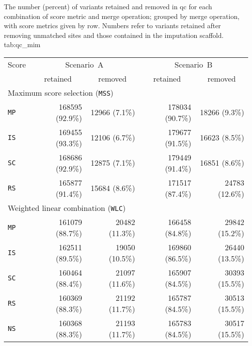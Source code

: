 

\begin{table}[!htb]
{The number (percent) of variants retained and removed in \gls{qc} for each combination of score metric and merge operation; grouped by merge operation, with score metrics given by row. Numbers refer to variants retained after removing unmatched sites and those contained in the imputation scaffold.}
{tab:qc_mim}
\centering
\begin{tabular}{lrrrr}
	\toprule
	\phantom{.} Score & \multicolumn{2}{c}{Scenario~A} & \multicolumn{2}{c}{Scenario~B} \\
	 \cmidrule(lr){2-3} \cmidrule(lr){4-5}
	 & \multicolumn{1}{c}{retained} & \multicolumn{1}{c}{removed}
	 & \multicolumn{1}{c}{retained} & \multicolumn{1}{c}{removed} \\
	\midrule
	\multicolumn{5}{l}{Maximum score selection (\texttt{MSS})} \\
	\midrule
	\phantom{.} \texttt{MP} &
	\num{168595} (92.9\%) & \num{12966} \phantom{0}(7.1\%)  &
	\num{178034} (90.7\%) & \num{18266} \phantom{0}(9.3\%)  \\
	\phantom{.} \texttt{IS} &
	\num{169455} (93.3\%) & \num{12106} \phantom{0}(6.7\%)  &
	\num{179677} (91.5\%) & \num{16623} \phantom{0}(8.5\%)  \\
	\phantom{.} \texttt{SC} &
	\num{168686} (92.9\%) & \num{12875} \phantom{0}(7.1\%)  &
	\num{179449} (91.4\%) & \num{16851} \phantom{0}(8.6\%)  \\
	\phantom{.} \texttt{RS} &
	\num{165877} (91.4\%) & \num{15684} \phantom{0}(8.6\%)  &
	\num{171517} (87.4\%) & \num{24783} (12.6\%) \\
	\midrule
	\multicolumn{5}{l}{Weighted linear combination (\texttt{WLC})} \\
	\midrule
	\phantom{.} \texttt{MP} &
	\num{161079} (88.7\%) & \num{20482} (11.3\%)  &
	\num{166458} (84.8\%) & \num{29842} (15.2\%) \\
	\phantom{.} \texttt{IS} &
	\num{162511} (89.5\%) & \num{19050} (10.5\%)  &
	\num{169860} (86.5\%) & \num{26440} (13.5\%) \\
	\phantom{.} \texttt{SC} &
	\num{160464} (88.4\%) & \num{21097} (11.6\%)  &
	\num{165907} (84.5\%) & \num{30393} (15.5\%) \\
	\phantom{.} \texttt{RS} &
	\num{160369} (88.3\%) & \num{21192} (11.7\%)  &
	\num{165787} (84.5\%) & \num{30513} (15.5\%) \\
	\phantom{.} \texttt{NS} &
	\num{160368} (88.3\%) & \num{21193} (11.7\%)  &
	\num{165783} (84.5\%) & \num{30517} (15.5\%) \\
	\bottomrule
\end{tabular}
\end{table}
